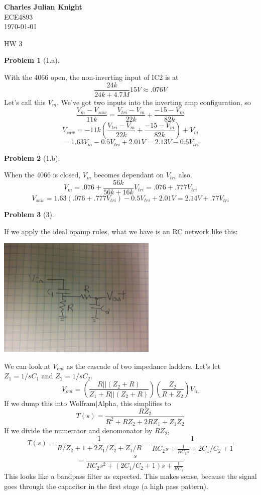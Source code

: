\documentclass[12pt]{article}
\newtheorem*{prob}{Problem}
\begin{document}
\begin{flushright}
\textbf{Charles Julian Knight}\\
ECE4893\\
\today
\end{flushright}


\begin{center}
\huge HW 3
\end{center}

\begin{prob}[1.a]{
}\end{prob}
With the 4066 open, the non-inverting input of IC2 is at 
\[\frac{24k}{24k+4.7M}15V \approx .076V\]
Let's call this $V_m$. We've got two inputs into the inverting amp
configuration, so
\[\frac{V_m - V_{saw}}{11k} = \frac{V_{tri}-V_m}{22k} + \frac{-15 - V_m}{82k}\]
\[V_{saw} = -11k \left( \frac{V_{tri}-V_m}{22k} + \frac{-15 - V_m}{82k}\right) + V_m \]
\[ = 1.63V_m - 0.5V_{tri}+2.01V = 2.13V - 0.5V_{tri}\]

\begin{prob}[1.b]{
}\end{prob}
When the 4066 is closed, $V_m$ becomes dependant on $V_{tri}$ also. 
\[V_m = .076 + \frac{56k}{56k+16k}V_{tri} = .076 + .777V_{tri}\]
\[V_{saw} =1.63(.076 + .777V_{tri}) - 0.5V_{tri}+2.01V = 2.14V + .77V_{tri} \]

\begin{prob}[3]{
}\end{prob}
If we apply the ideal opamp rules, what we have is an RC network like this:
\begin{center}
\includegraphics[width=3in]{p3.jpg}
\end{center}
We can look at $V_{out}$ as the cascade of two impedance ladders.
Let's let $Z_1 = 1/sC_1$ and $Z_2=1/sC_2$.
\[V_{out} = \left( \frac{R||(Z_2+R)}{Z_1+R||(Z_2+R)} \right)\left( \frac{Z_2}{R+Z_2} \right)V_{in}\]
If we dump this into Wolfram$|$Alpha, this simplifies to
\[T(s) = \frac{RZ_2}{R^2 + RZ_2 + 2RZ_1 + Z_1Z_2}\]
If we divide the numerator and denomonator by $RZ_2$,
\[T(s) = \frac{1}{R/Z_2 + 1 + 2Z_1/Z_2 + Z_1/R} = \frac{1}{RC_2s + \frac{1}{RC_1s} + 2C_1/C_2 + 1}\]
\[= \frac{s}{RC_2s^2 + (2C_1/C_2 + 1)s+ \frac{1}{RC_1}}\]
This looks like a bandpass filter as expected. This makes sense, because the signal goes through the capacitor
in the first stage (a high pass pattern).
\end{document}
